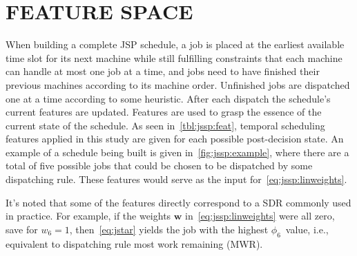 \documentclass[a4paper,twoside]{article}
\renewcommand{\vec}[1]{\mathbf{#1}}
\newcommand{\phiwrmJob}{$\phi_6$}
\begin{document}
\section{\uppercase{Feature space}}\label{sec:feat}
When building a complete JSP schedule, a job is placed at the earliest available time slot for its next machine while still fulfilling constraints that each machine can handle at most one job at a time, and jobs need to have finished their previous machines according to its machine order. 
Unfinished jobs are dispatched one at a time according to some heuristic. After each dispatch the schedule's current features are updated.
Features are used to grasp the essence of the current state of the schedule. As seen in~\cref{tbl:jssp:feat}, temporal scheduling features applied in this study are given for each possible post-decision state. An example of a schedule being built is given in~\cref{fig:jssp:example}, where there are a total of five possible jobs that could be chosen to be dispatched by some dispatching rule. These features would serve as the input for~\cref{eq:jssp:linweights}. 

It's noted that some of the features directly correspond to a SDR commonly used in practice. For example, if the weights $\vec{w}$ in~\cref{eq:jssp:linweights} were all zero, save for $w_6=1$, then~\eqref{eq:jstar} yields the job with the highest \phiwrmJob\ value, i.e., equivalent  to dispatching rule most work remaining (MWR).
\end{document}
